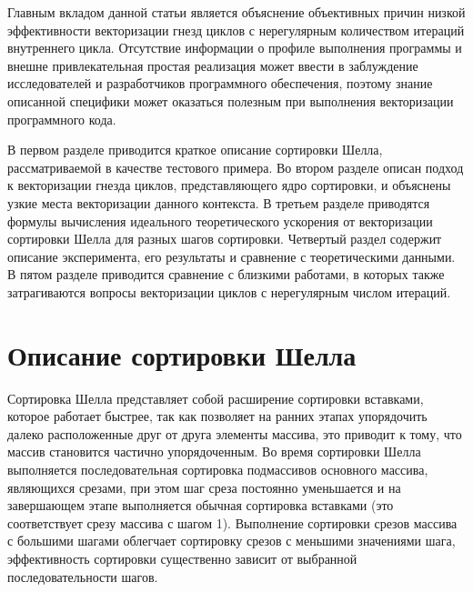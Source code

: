 \documentclass[utf8]{psta}
\begin{document}
Главным вкладом данной статьи является объяснение объективных причин низкой эффективности векторизации гнезд циклов с нерегулярным количеством итераций внутреннего цикла.
Отсутствие информации о профиле выполнения программы и внешне привлекательная простая реализация может ввести в заблуждение исследователей и разработчиков программного обеспечения, поэтому знание описанной специфики может оказаться полезным при выполнения векторизации программного кода.

В первом разделе приводится краткое описание сортировки Шелла, рассматриваемой в качестве тестового примера.
Во втором разделе описан подход к векторизации гнезда циклов, представляющего ядро сортировки, и объяснены узкие места векторизации данного контекста.
В третьем разделе приводятся формулы вычисления идеального теоретического ускорения от векторизации сортировки Шелла для разных шагов сортировки.
Четвертый раздел содержит описание эксперимента, его результаты и сравнение с теоретическими данными.
В пятом разделе приводится сравнение с близкими работами, в которых также затрагиваются вопросы векторизации циклов с нерегулярным числом итераций.

\section{Описание сортировки Шелла}

Сортировка Шелла \cite{Knuth} представляет собой расширение сортировки вставками, которое работает быстрее, так как позволяет на ранних этапах упорядочить далеко расположенные друг от друга элементы массива, это приводит к тому, что массив становится частично упорядоченным. 
Во время сортировки Шелла выполняется последовательная сортировка подмассивов основного массива, являющихся срезами, при этом шаг среза постоянно уменьшается и на завершающем этапе выполняется обычная сортировка вставками (это соответствует срезу массива с шагом 1).
Выполнение сортировки срезов массива с большими шагами облегчает сортировку срезов с меньшими значениями шага, эффективность сортировки существенно зависит от выбранной последовательности шагов. 
\end{document}

